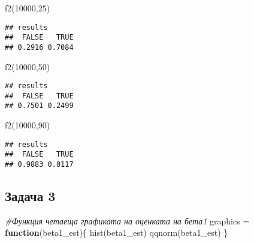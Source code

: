 \documentclass[
]{article}
\newenvironment{Shaded}{\begin{snugshade}}{\end{snugshade}}
\newcommand{\CommentTok}[1]{\textcolor[rgb]{0.56,0.35,0.01}{\textit{#1}}}
\newcommand{\ControlFlowTok}[1]{\textcolor[rgb]{0.13,0.29,0.53}{\textbf{#1}}}
\newcommand{\DecValTok}[1]{\textcolor[rgb]{0.00,0.00,0.81}{#1}}
\newcommand{\FunctionTok}[1]{\textcolor[rgb]{0.00,0.00,0.00}{#1}}
\newcommand{\NormalTok}[1]{#1}
\newcommand{\OtherTok}[1]{\textcolor[rgb]{0.56,0.35,0.01}{#1}}
\begin{document}
\begin{Shaded}
\begin{Highlighting}[]
\FunctionTok{f2}\NormalTok{(}\DecValTok{10000}\NormalTok{,}\DecValTok{25}\NormalTok{)}
\end{Highlighting}
\end{Shaded}

\begin{verbatim}
## results
##  FALSE   TRUE 
## 0.2916 0.7084
\end{verbatim}

\begin{Shaded}
\begin{Highlighting}[]
\FunctionTok{f2}\NormalTok{(}\DecValTok{10000}\NormalTok{,}\DecValTok{50}\NormalTok{)}
\end{Highlighting}
\end{Shaded}

\begin{verbatim}
## results
##  FALSE   TRUE 
## 0.7501 0.2499
\end{verbatim}

\begin{Shaded}
\begin{Highlighting}[]
\FunctionTok{f2}\NormalTok{(}\DecValTok{10000}\NormalTok{,}\DecValTok{90}\NormalTok{)}
\end{Highlighting}
\end{Shaded}

\begin{verbatim}
## results
##  FALSE   TRUE 
## 0.9883 0.0117
\end{verbatim}

\hypertarget{ux437ux430ux434ux430ux447ux430-3}{%
\subsection{\texorpdfstring{\textbf{Задача
3}}{Задача 3}}\label{ux437ux430ux434ux430ux447ux430-3}}

\begin{Shaded}
\begin{Highlighting}[]
\CommentTok{\#Функция четаеща графиката на оценката на бета1}
\NormalTok{graphics }\OtherTok{=} \ControlFlowTok{function}\NormalTok{(beta1\_est)\{}
  \FunctionTok{hist}\NormalTok{(beta1\_est)}
  \FunctionTok{qqnorm}\NormalTok{(beta1\_est)}
\NormalTok{\}}
\end{Highlighting}
\end{Shaded}
\end{document}
